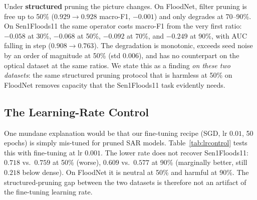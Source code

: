 \documentclass[conference]{IEEEtran}
\newif\ifreview
\newcommand{\REV}[1]{\ifreview\textcolor{red}{\textbf{[Revise: #1]}}\fi}
\newcommand{\HL}[1]{\ifreview\colorbox{yellow!55}{#1}\else #1\fi}
\begin{document}
Under \textbf{structured} pruning the picture changes. On FloodNet,
filter pruning is free up to 50\% ($0.929 \to 0.928$ macro-F1,
$-0.001$) and only degrades at 70--90\%. On Sen1Floods11 the same
operator costs macro-F1 from the very first ratio: \HL{$-0.058$} at 30\%,
\HL{$-0.068$} at 50\%, \HL{$-0.092$} at 70\%, and \HL{$-0.249$} at 90\%, with AUC
falling in step ($0.908 \to 0.763$). The degradation is monotonic,
exceeds seed noise by an order of magnitude at 50\% (std $0.006$), and
has no counterpart on the optical dataset at the same ratios. We state
this as a finding \emph{on these two datasets}: the same structured
pruning protocol that is harmless at 50\% on FloodNet removes capacity
that the Sen1Floods11 task evidently needs.
\REV{[A2] Recompute from unrounded values: 30\%: 0.0584, 50\%: 0.0674
(not 0.068), 70\%: 0.0923, 90\%: 0.2493. Also AUC ``0.908 $\to$ 0.763''
check. [B5] ``exceeds seed noise by an order of magnitude'' needs a
test or CI, not a ratio of one std. Also note FloodNet at 70\%
(0.857$\pm$0.063) is already noisy -- say so; the claim ``harmless up
to 50\%'' is the supportable one. [A12] ``evidently needs'' is
speculation. Test it with B7: (1) histogram of per-filter $L_1$
norms of the dense models on both datasets (no training needed; if SAR
norms are flatter, $L_1$ is a poorer importance criterion there);
(2) per-class recall/confusion of SAR struct.\ 50\% vs.\ dense (which
class pays?); (3) optionally Grad-CAM (Selvaraju et al.) on a few SAR
chips. A single extra figure with (1) would make the paper much more
than descriptive. Also: the monotonic ``unstructured $\geq$ structured
at equal nonzero parameters'' view is confounded by A11(b).}

\subsection{The Learning-Rate Control}
One mundane explanation would be that our fine-tuning recipe (SGD, lr
$0.01$, 50 epochs) is simply mis-tuned for pruned SAR models.
Table~\ref{tab:lrcontrol} tests this with fine-tuning at lr $0.001$.
The lower rate does not recover Sen1Floods11: $0.718$ vs.\ $0.759$ at
50\% (worse), $0.609$ vs.\ $0.577$ at 90\% (marginally better, still
$0.218$ below dense). On FloodNet it is neutral at 50\% and harmful at
90\%. The structured-pruning gap between the two datasets is therefore
not an artifact of the fine-tuning learning rate.
\REV{[B4] Soften to ``is not explained by the fine-tuning learning rate
within the tested range'' unless B4 is done. $0.827-0.609=0.218$ OK.
Only one direction (lower lr) was tested; a reviewer will ask about
higher lr / momentum / longer schedule.}
\end{document}

